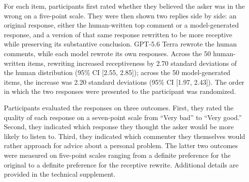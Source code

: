\documentclass[letterpaper]{article} %
\begin{document}
For each item, participants first rated whether they believed the asker was in the wrong on a five-point scale. They were then shown two replies side by side: an original response, either the human-written top comment or a model-generated response, and a version of that same response rewritten to be more receptive while preserving its substantive conclusion. GPT-5.6 Terra rewrote the human comments, while each model rewrote its own responses. Across the 50 human-written items, rewriting increased receptiveness by 2.70 standard deviations of the human distribution (95\% CI [2.55, 2.85]); across the 50 model-generated items, the increase was 2.20 standard deviations (95\% CI [1.97, 2.43]). The order in which the two responses were presented to the participant was randomized.

Participants evaluated the responses on three outcomes. First, they rated the quality of each response on a seven-point scale from ``Very bad'' to ``Very good.'' Second, they indicated which response they thought the asker would be more likely to listen to. Third, they indicated which commenter they themselves would rather approach for advice about a personal problem. The latter two outcomes were measured on five-point scales ranging from a definite preference for the original to a definite preference for the receptive rewrite. Additional details are provided in the technical supplement.


\end{document}
